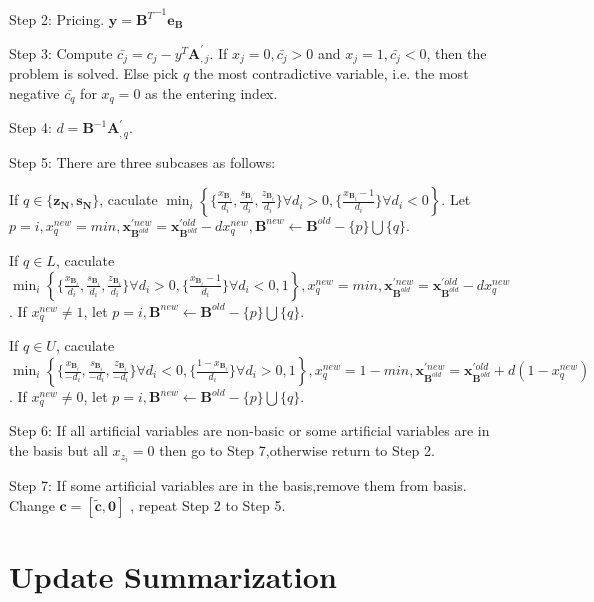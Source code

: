 \documentclass{article}
\begin{document}
Step 2: Pricing. $\mathbf{y} = {\mathbf{B}^T}^{-1}\mathbf{e_B}$

Step 3: Compute $\bar{c_j} = c_j - y^T\mathbf{A}_{,j}^{'}$. If $x_j = 0, \bar{c_j} > 0$ and $x_j = 1,\bar{c_j} < 0$, then the problem is solved. Else pick $q$ the most contradictive variable, i.e. the most negative $\bar{c_q}$ for $x_q = 0$ as the entering index.

Step 4: $d = \mathbf{B}^{-1}\mathbf{A}_{,q}^{'}$.

Step 5: There are three subcases as follows:

If $q \in \{ \mathbf{z_N}, \mathbf{s_N}\}$, caculate $\min_i \left\{\{\frac{x_{\mathbf{B}_{i}}}{d_i}, \frac{s_{\mathbf{B}_{i}}}{d_i}, \frac{z_{\mathbf{B}_{i}}}{d_i}\} \forall d_i>0, \{\frac{x_{\mathbf{B}_{i}}-1}{d_i}\} \forall d_i<0\right\}$.
Let $p=i, x_q^{new} = min, \mathbf{x}_{\mathbf{B}^{old}}^{'new} = \mathbf{x}_{\mathbf{B}^{old}}^{'old} - dx_q^{new}, \mathbf{B}^{new} \leftarrow \mathbf{B}^{old} - \{p\} \bigcup \{q\}.$

If $q \in L$,  caculate $\min_i \left\{\{\frac{x_{\mathbf{B}_{i}}}{d_i}, \frac{s_{\mathbf{B}_{i}}}{d_i}, \frac{z_{\mathbf{B}_{i}}}{d_i}\} \forall d_i>0, \{\frac{x_{\mathbf{B}_{i}}-1}{d_i}\} \forall d_i<0, 1 \right\}, x_q^{new} = min,
\mathbf{x}_{\mathbf{B}^{old}}^{'new} = \mathbf{x}_{\mathbf{B}^{old}}^{'old} - dx_q^{new}$. If $x_q^{new} \neq 1$, let $p=i, \mathbf{B}^{new} \leftarrow \mathbf{B}^{old} - \{p\} \bigcup \{q\}.$

If $q \in U$,  caculate $\min_i \left\{\{\frac{x_{\mathbf{B}_{i}}}{-d_i}, \frac{s_{\mathbf{B}_{i}}}{-d_i}, \frac{z_{\mathbf{B}_{i}}}{-d_i}\} \forall d_i<0, \{\frac{1-x_{\mathbf{B}_{i}}}{d_i}\} \forall d_i>0, 1 \right\}, x_q^{new} = 1 - min, \mathbf{x}_{\mathbf{B}^{old}}^{'new} = \mathbf{x}_{\mathbf{B}^{old}}^{'old} + d(1-x_q^{new})$. If $x_q^{new} \neq 0$, let $p=i, \mathbf{B}^{new} \leftarrow \mathbf{B}^{old} - \{p\} \bigcup \{q\}.$

Step 6: If all artificial variables are non-basic or some artificial variables are in the basis but all $x_{z_i} = 0$ then go to Step 7,otherwise return to Step 2.

Step 7: If some artificial variables are in the basis,remove them from basis. Change $\mathbf{c}=[\tilde{\mathbf{c}},\mathbf{0}]$ , repeat Step 2 to Step 5.


\section{Update Summarization}
\end{document}
